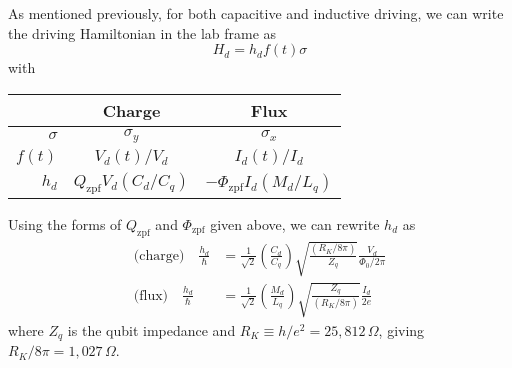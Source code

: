 

As mentioned previously, for both capacitive and inductive driving, we can write the driving Hamiltonian in the lab frame as
\begin{equation*}
  H_d = h_d f(t) \sigma
\end{equation*}
with
\begin{center}
  \begin{tabular}{r|cc}
    \hline
    & \textbf{Charge} & \textbf{Flux} \\
    \hline
    $\sigma$ & $\sigma_y$ & $\sigma_x$ \\
    $f(t)$ & $V_d(t)/V_d$ & $I_d(t) / I_d$ \\
    $h_d$ & $Q_\text{zpf} V_d(C_d/C_q)$ & $-\Phi_\text{zpf} I_d (M_d/L_q)$ \\
    \hline
  \end{tabular}
\end{center}
Using the forms of $Q_\text{zpf}$ and $\Phi_\text{zpf}$ given above, we can rewrite $h_d$ as
\begin{align*}
  \text{(charge)} \quad \frac{h_d}{\hbar} &=
  \frac{1}{\sqrt{2}} \left(\frac{C_d}{C_q} \right) \sqrt{\frac{(R_K / 8\pi)}{Z_q}} \frac{V_d}{\Phi_0/2\pi} \\
  \text{(flux)} \quad \frac{h_d}{\hbar} &=
  \frac{1}{\sqrt{2}} \left( \frac{M_d}{L_q} \right) \sqrt{\frac{Z_q}{(R_K/8\pi)}} \frac{I_d}{2e}
\end{align*}
where $Z_q$ is the qubit impedance and $R_K \equiv h/e^2 = 25,812 \, \Omega$, giving $R_K/8\pi = 1,027 \, \Omega$.


